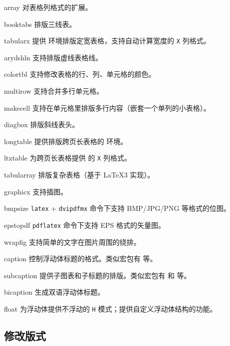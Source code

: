 \begin{pkglist}
  \item[array]      对表格列格式的扩展。
  \item[booktabs]   排版三线表。
  \item[tabularx]   提供  环境排版定宽表格，支持自动计算宽度的 \texttt{X} 列格式。
  \item[arydshln]   支持排版虚线表格线。
  \item[colortbl]   支持修改表格的行、列、单元格的颜色。
  \item[multirow]   支持合并多行单元格。
  \item[makecell]   支持在单元格里排版多行内容（嵌套一个单列的小表格）。
  \item[diagbox]    排版斜线表头。
  \item[longtable]  提供排版跨页长表格的  环境。
  \item[ltxtable]   为跨页长表格提供  的 \texttt{X} 列格式。
  \item[tabularray] 排版复杂表格（基于 \LaTeX3 实现）。
  \item[graphicx]   支持插图。
  \item[bmpsize]    \texttt{latex} + \texttt{dvipdfmx} 命令下支持 BMP/JPG/PNG 等格式的位图。
  \item[epstopdf]   \texttt{pdflatex} 命令下支持 EPS 格式的矢量图。
  \item[wrapfig]    支持简单的文字在图片周围的绕排。
  \item[caption]    控制浮动体标题的格式。类似宏包有  等。
  \item[subcaption] 提供子图表和子标题的排版。类似宏包有  和  等。
  \item[bicaption]  生成双语浮动体标题。
  \item[float]      为浮动体提供不浮动的 \texttt{H} 模式；提供自定义浮动体结构的功能。
\end{pkglist}

\subsection{修改版式}\label{subsec:pkg-layout}

